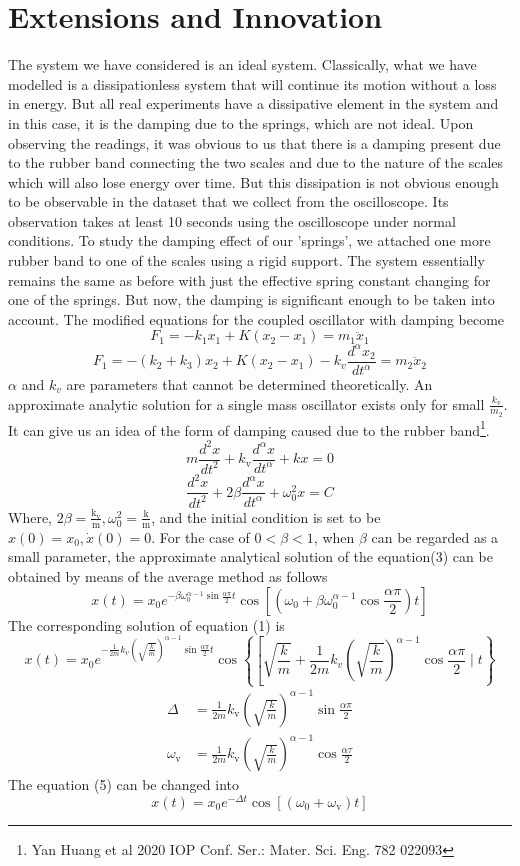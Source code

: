 \chapter{\label{method}Extensions and Innovation}

The system we have considered is an ideal system. Classically, what we have modelled is a dissipationless system that will continue its motion without a loss in energy. But all real experiments have a dissipative element in the system and in this case, it is the damping due to the springs, which are not ideal. Upon observing the readings, it was obvious to us that there is a damping present due to the rubber band connecting the two scales and due to the nature of the scales which will also lose energy over time. But this dissipation is not obvious enough to be observable in the dataset that we collect from the oscilloscope. Its observation takes at least 10 seconds using the oscilloscope under normal conditions. To study the damping effect of our 'springs', we attached one more rubber band to one of the scales using a rigid support. The system essentially remains the same as before with just the effective spring constant changing for one of the springs. But now, the damping is significant enough to be taken into account. The modified equations for the coupled oscillator with damping become
$$F_1=-k_1x_1+K(x_2-x_1)=m_1\ddot{x}_{1}$$
$$F_1=-(k_2+k_3)x_2+K(x_2-x_1)-k_v\frac{d ^\alpha x_2}{dt^\alpha}=m_2\ddot{x}_{2}$$
$\alpha$ and $k_v$ are parameters that cannot be determined theoretically. An approximate analytic solution for a single mass oscillator exists only for small $\frac{k_v}{m_2}$. It can give us an idea of the form of damping caused due to the rubber band\footnote{Yan Huang et al 2020 IOP Conf. Ser.: Mater. Sci. Eng. 782 022093}.
\[ m \frac{d^{2} x}{d t^{2}}+k_{\mathrm{v}} \frac{d^{\alpha} x}{d t^{\alpha}}+k x=0 \]
\[\frac{d^{2} x}{d t^{2}}+2 \beta \frac{d^{\alpha} x}{d t^{\alpha}}+\omega_{0}^{2} x=C\]Where, \( 2 \beta=\frac{\mathrm{k}_{\mathrm{v}}}{\mathrm{m}}, \omega_{0}^{2}=\frac{\mathrm{k}}{\mathrm{m}} \), and the initial condition is set to be \( x(0)=x_{0}, \dot{x}(0)=0 \).
For the case of \( 0<\beta<1 \), when \( \beta \) can be regarded as a small parameter, the approximate analytical solution of the equation(3) can be obtained by means of the average method as follows\[x(t)=x_{0} e^{-\beta \omega_{0}^{\alpha-1} \sin \frac{\alpha \pi}{2} t} \cos \left[\left(\omega_{0}+\beta \omega_{0}^{\alpha-1} \cos \frac{\alpha \pi}{2}\right) t\right]\]The corresponding solution of equation (1) is\[x(t)=x_{0} e^{-\frac{1}{2 m} k_{v}\left(\sqrt{\frac{k}{m}}\right)^{\alpha-1} \sin \frac{\alpha \pi}{2} t} \cos \left\{\left[\sqrt{\frac{k}{m}}+\frac{1}{2 m} k_{v}\left(\sqrt{\frac{k}{m}}\right)^{\alpha-1} \cos \frac{\alpha \pi}{2} \mid t\right\}\right.\]
\[\begin{aligned}\Delta & =\frac{1}{2 m} k_{\mathrm{v}}\left(\sqrt{\frac{k}{m}}\right)^{\alpha-1} \sin \frac{\alpha \pi}{2} \\\omega_{\mathrm{v}} & =\frac{1}{2 m} k_{\mathrm{v}}\left(\sqrt{\frac{k}{m}}\right)^{\alpha-1} \cos \frac{\alpha \tau}{2}\end{aligned}\]The equation (5) can be changed into\[x(t)=x_{0} e^{-\Delta t} \cos \left[\left(\omega_{0}+\omega_{\mathrm{v}}\right) t\right]\]

